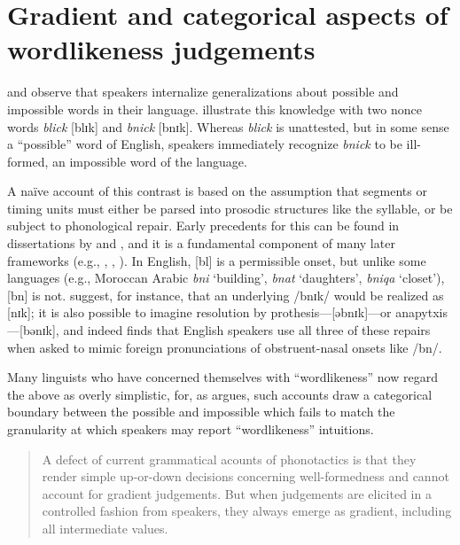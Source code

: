 \chapter{Gradient and categorical aspects of wordlikeness judgements} \label{gradience}

\citet{Halle1962} and \citet{Chomsky1965} observe that speakers internalize generalizations about possible and impossible words in their language. \citeauthor{Chomsky1965} illustrate this knowledge with two nonce words \emph{blick} [blɪk] and \emph{bnick} [bnɪk]. Whereas \emph{blick} is unattested, but in some sense a ``possible'' word of English, speakers immediately recognize \emph{bnick} to be ill-formed, an impossible word of the language.

A naïve account of this contrast is based on the assumption that segments or timing units must either be parsed into prosodic structures like the syllable, or be subject to phonological repair. Early precedents for this can be found in dissertations by \citet[10f.]{Hooper1973} and \citet[57f.]{Kahn1976}, and it is a fundamental component of many later frameworks (e.g., \citealt{Ito1989a}, \citealt{Noske1992}, \citealt{OT}). In English, [bl] is a permissible onset, but unlike some languages (e.g., Moroccan Arabic \emph{bni} `building', \emph{bnat} `daughters', \emph{bniqa} `closet'), [bn] is not. \citet[][19f.]{Wolf2009} suggest, for instance, that an underlying /bnɪk/ would be realized as [nɪk]; it is also possible to imagine resolution by prothesis---[əbnɪk]---or anapytxis---[bənɪk], and indeed \citet{Davidson2006b} finds that English speakers use all three of these repairs when asked to mimic foreign pronunciations of obstruent-nasal onsets like /bn/.

Many linguists who have concerned themselves with ``wordlikeness'' now regard the above as overly simplistic, for, as \citeauthor{Shademan2006} argues, such accounts draw a categorical boundary between the possible and impossible which fails to match the granularity at which speakers may report ``wordlikeness'' intuitions.

\begin{quote}
A defect of current grammatical acounts of phonotactics is that they render simple up-or-down decisions concerning well-formedness and cannot account for gradient judgements. But when judgements are elicited in a controlled fashion from speakers, they always emerge as gradient, including all intermediate values. \citep[][371]{Shademan2006} 
\end{quote}

